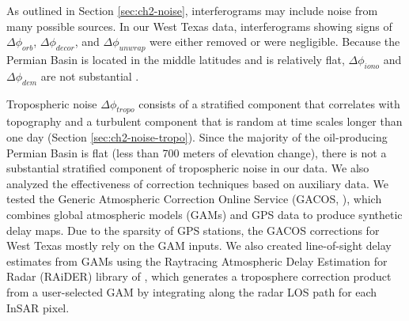 As outlined in Section \ref{sec:ch2-noise}, interferograms may include noise from many possible sources. %
In our West Texas data, interferograms showing signs of $\Delta \phi_{orb}$, $\Delta \phi_{decor}$, and $\Delta \phi_{unwrap}$ were either removed or were negligible. Because the Permian Basin is located in the middle latitudes and is relatively flat, $\Delta \phi_{iono}$ and $\Delta \phi_{dem}$  are not substantial \citep{Fattahi2013DemErrorCorrection, Liang2019IonosphericCorrectionInsar}. 




Tropospheric noise $\Delta \phi_{tropo}$ consists of a stratified component that correlates with topography \citep{Doin2009CorrectionsStratifiedTropospheric} and a turbulent component that is random at time scales longer than one day \citep{Emardson2003NeutralAtmosphericDelay} (Section \ref{sec:ch2-noise-tropo}).
Since the majority of the oil-producing Permian Basin is flat (less than 700 meters of elevation change), there is not a substantial stratified component of tropospheric noise in our data. 
We also analyzed the effectiveness of correction techniques based on auxiliary data.
We tested the Generic Atmospheric Correction Online Service (GACOS, \citep{Yu2018InterferometricSyntheticAperture,Yu2018GenericAtmosphericCorrection}), which combines global atmospheric models (GAMs) and GPS data to produce synthetic delay maps. 
Due to the sparsity of GPS stations, the GACOS corrections for West Texas mostly rely on the GAM inputs.
We also created line-of-sight delay estimates from GAMs using the Raytracing Atmospheric Delay Estimation for Radar (RAiDER) library of \cite{Maurer2021RaiderRaytracingAtmospheric}, which generates a troposphere correction product from a user-selected GAM by integrating along the radar LOS path for each InSAR pixel.
%


